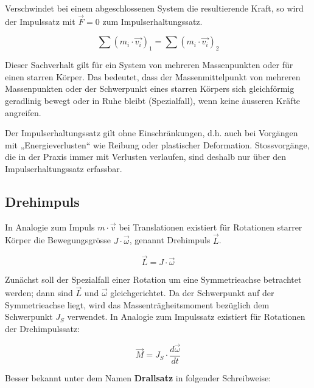 Verschwindet bei einem abgeschlossenen System die resultierende Kraft, so wird der
Impulssatz mit $\overrightarrow{F} = 0$ zum Impulserhaltungssatz.

\begin{equbox}
    \begin{equation}
        \sum (m_i \cdot \overrightarrow{v_i})_1 = \sum (m_i \cdot \overrightarrow{v_i})_2
    \end{equation}
\end{equbox}

Dieser Sachverhalt gilt für ein System von mehreren Massenpunkten oder für einen starren
Körper. Das bedeutet, dass der Massenmittelpunkt von mehreren Massenpunkten oder der
Schwerpunkt eines starren Körpers sich gleichförmig geradlinig bewegt oder in Ruhe bleibt
(Spezialfall), wenn keine äusseren Kräfte angreifen.

Der Impulserhaltungssatz gilt ohne Einschränkungen, d.h. auch bei Vorgängen mit
„Energieverlusten“ wie Reibung oder plastischer Deformation. Stossvorgänge, die in der
Praxis immer mit Verlusten verlaufen, sind deshalb nur über den Impulserhaltungssatz
erfassbar.

\subsection{Drehimpuls}

In Analogie zum Impuls $m \cdot \overrightarrow{v}$ bei Translationen existiert für Rotationen starrer Körper die
Bewegungsgrösse $J \cdot \overrightarrow{\omega}$, genannt Drehimpuls $\overrightarrow{L}$.

\begin{equation}
    \overrightarrow{L} = J \cdot \overrightarrow{\omega}
\end{equation}

Zunächst soll der Spezialfall einer Rotation um eine Symmetrieachse betrachtet werden; dann
sind $\overrightarrow{L}$ und $\overrightarrow{\omega}$ gleichgerichtet. Da der Schwerpunkt auf der Symmetrieachse liegt, wird das
Massenträgheitsmoment bezüglich dem Schwerpunkt $J_S$ verwendet.
In Analogie zum Impulssatz existiert für Rotationen der Drehimpulssatz:

\begin{equation}
    \overrightarrow{M} = J_S \cdot \frac{d \overrightarrow{\omega}}{dt}
\end{equation}

Besser bekannt unter dem Namen \textbf{Drallsatz} in folgender Schreibweise:

